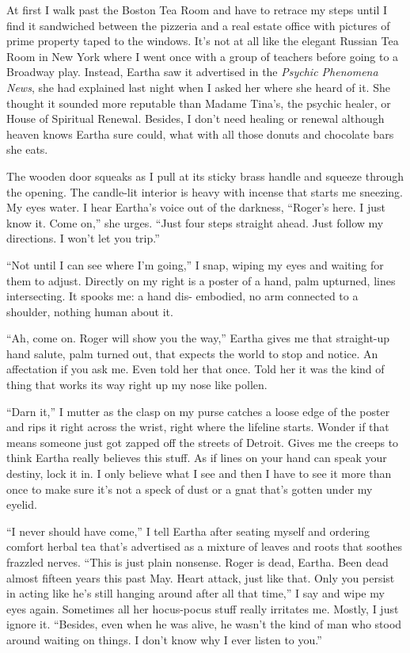 \documentclass[twoside,10pt]{book}
\begin{document}
At first I walk past the Boston Tea Room and have to retrace my steps
until I find it sand­wiched between the pizzeria and a real estate
office with pictures of prime property taped to the win­dows. It's not
at all like the elegant Russian Tea Room in New York where I went once
with a group of teachers before going to a Broadway play. Instead,
Eartha saw it advertised in the \emph{Psychic Phenomena News}, she had
explained last night when I asked her where she heard of it. She thought
it sounded more reputable than Madame Tina's, the psychic healer, or
House of Spiritual Renewal. Besides, I don't need healing or renewal
although heaven knows Eartha sure could, what with all those donuts and
chocolate bars she eats.

The wooden door squeaks as I pull at its sticky brass handle and squeeze
through the opening. The candle-lit interior is heavy with incense that
starts me sneezing. My eyes water. I hear Eartha's voice out of the
darkness, ``Roger's here. I just know it. Come on,'' she urges. ``Just
four steps straight ahead. Just follow my directions. I won't let you
trip.''

``Not until I can see where I'm going,'' I snap, wiping my eyes and
waiting for them to adjust. Directly on my right is a poster of a hand,
palm upturned, lines intersecting. It spooks me: a hand dis-
\clearpage
embodied, no
arm connected to a shoulder, nothing human about it.

``Ah, come on. Roger will show you the way,'' Eartha gives me that
straight-up hand salute, palm turned out, that expects the world to stop
and notice. An affectation if you ask me. Even told her that once. Told
her it was the kind of thing that works its way right up my nose like
pollen.

``Darn it,'' I mutter as the clasp on my purse catches a loose edge of
the poster and rips it right across the wrist, right where the lifeline
starts. Wonder if that means someone just got zapped off the streets of
Detroit. Gives me the creeps to think Eartha really believes this stuff.
As if lines on your hand can speak your destiny, lock it in. I only
believe what I see and then I have to see it more than once to make sure
it's not a speck of dust or a gnat that's gotten under my eyelid.

``I never should have come,'' I tell Eartha after seating myself and
ordering comfort herbal tea that's advertised as a mixture of leaves and
roots that soothes frazzled nerves. ``This is just plain non­sense.
Roger is dead, Eartha. Been dead almost fifteen years this past May.
Heart attack, just like that. Only you persist in acting like he's still
hanging around after all that time,'' I say and wipe my eyes again.
Sometimes all her hocus-pocus stuff really irritates me. Mostly, I just
ignore it. ``Besides, even when he was alive, he wasn't the kind of man
who stood around waiting on things. I don't know why I ever listen to
you.''
\end{document}

